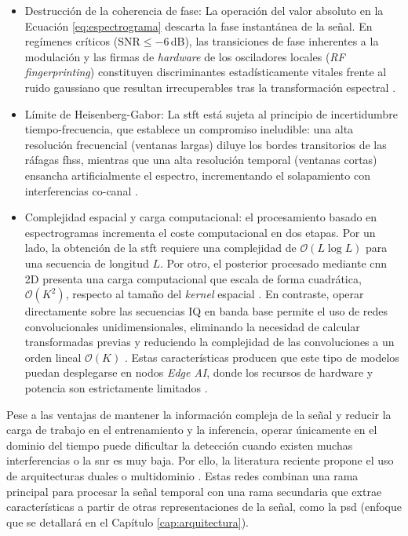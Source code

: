 \begin{itemize}
    \item Destrucción de la coherencia de fase: La operación del valor absoluto en la Ecuación \ref{eq:espectrograma} descarta la fase instantánea de la señal. En regímenes críticos ($\text{SNR} \le -6$\,dB), las transiciones de fase inherentes a la modulación y las firmas de \textit{hardware} de los osciladores locales (\textit{RF fingerprinting}) constituyen discriminantes estadísticamente vitales frente al ruido gaussiano que resultan irrecuperables tras la transformación espectral \cite{zheng_deep_2025}.

    \item Límite de Heisenberg-Gabor: La \gls{stft} está sujeta al principio de incertidumbre tiempo-frecuencia, que establece un compromiso ineludible: una alta resolución frecuencial (ventanas largas) diluye los bordes transitorios de las ráfagas \gls{fhss}, mientras que una alta resolución temporal (ventanas cortas) ensancha artificialmente el espectro, incrementando el solapamiento con interferencias co-canal \cite{oppenheim_discrete_2014}.

    \item Complejidad espacial y carga computacional: el procesamiento basado en espectrogramas incrementa el coste computacional en dos etapas. Por un lado, la obtención de la \gls{stft} requiere una complejidad de $\mathcal{O}(L \log L)$ para una secuencia de longitud $L$. Por otro, el posterior procesado mediante \gls{cnn} 2D presenta una carga computacional que escala de forma cuadrática, $\mathcal{O}(K^2)$, respecto al tamaño del \textit{kernel} espacial \cite{alam_rf-enabled_2023}. En contraste, operar directamente sobre las secuencias IQ en banda base permite el uso de redes convolucionales unidimensionales, eliminando la necesidad de calcular transformadas previas y reduciendo la complejidad de las convoluciones a un orden lineal $\mathcal{O}(K)$ \cite{zheng_deep_2025}. Estas características producen que este tipo de modelos puedan desplegarse en nodos \textit{Edge AI}, donde los recursos de hardware y potencia son estrictamente limitados \cite{cai_toward_2024, zhang_edge_2023}.
\end{itemize}

Pese a las ventajas de mantener la información compleja de la señal y reducir la carga de trabajo en el entrenamiento y la inferencia, operar únicamente en el dominio del tiempo puede dificultar la detección cuando existen muchas interferencias o la \gls{snr} es muy baja. Por ello, la literatura reciente propone el uso de arquitecturas duales o multidominio \cite{liu_method_2026}. Estas redes combinan una rama principal para procesar la señal temporal con una rama secundaria que extrae características a partir de otras representaciones de la señal, como la \gls{psd} (enfoque que se detallará en el Capítulo \ref{cap:arquitectura}).

